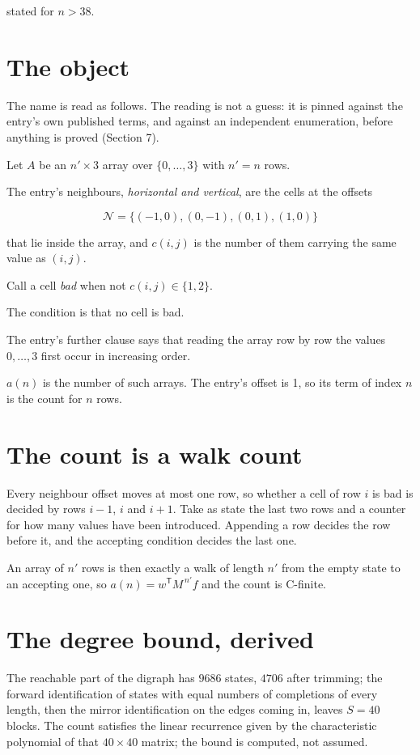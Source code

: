 \documentclass[11pt]{article}
\theoremstyle{definition}
\begin{document}
stated for $n > 38$.

\section{The object}

The name is read as follows. The reading is not a guess: it is pinned against the entry's own published terms, and against an independent enumeration, before anything is proved (Section 7).

Let $A$ be an $n' \times 3$ array over $\{0,\dots,3\}$ with $n' = n$ rows.

The entry's neighbours, {\itshape horizontal and vertical}, are the cells at the offsets

\[\mathcal{N} = \{(-1,0), (0,-1), (0,1), (1,0)\}\]

that lie inside the array, and $c(i,j)$ is the number of them carrying the same value as $(i,j)$.

Call a cell {\itshape bad} when not $c(i,j) \in \{1, 2\}$.

The condition is that no cell is bad.

The entry's further clause says that reading the array row by row the values $0,\dots,3$ first occur in increasing order.

$a(n)$ is the number of such arrays. The entry's offset is 1, so its term of index $n$ is the count for $n$ rows.

\section{The count is a walk count}

Every neighbour offset moves at most one row, so whether a cell of row $i$ is bad is decided by rows $i-1$, $i$ and $i+1$. Take as state the last two rows and a counter for how many values have been introduced. Appending a row decides the row before it, and the accepting condition decides the last one.

An array of $n'$ rows is then exactly a walk of length $n'$ from the empty state to an accepting one, so $a(n) = w^{\mathsf T}M^{\,n'}f$ and the count is C-finite.

\section{The degree bound, derived}

The reachable part of the digraph has $9686$ states, $4706$ after trimming; the forward identification of states with equal numbers of completions of every length, then the mirror identification on the edges coming in, leaves $S = 40$ blocks. The count satisfies the linear recurrence given by the characteristic polynomial of that $40\times40$ matrix; the bound is computed, not assumed.
\end{document}
